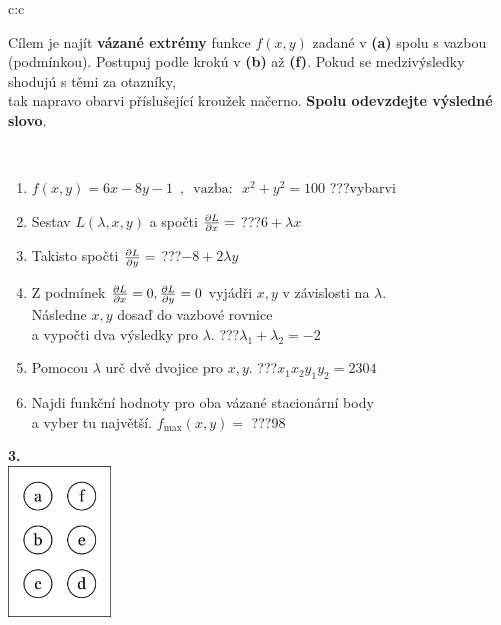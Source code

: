 \documentclass[10pt]{report}
\begin{document}
\begin{tabular}{c:c}
\begin{minipage}[c][104.5mm][t]{0.5\linewidth}
\begin{center}
\begin{minipage}{0.95\linewidth}
\begin{center}
Cílem je najít \textbf{vázané extrémy} funkce $f(x,y)$ zadané v \textbf{(a)} spolu s vazbou (podmínkou). Postupuj podle krokú v \textbf{(b)} až \textbf{(f)}. Pokud se medzivýsledky shodujú s těmi za otazníky,\\tak napravo obarvi příslušející kroužek načerno. \textbf{Spolu odevzdejte výsledné slovo}.
\end{center}
\end{minipage}
\\[1mm]
\begin{minipage}{0.79\linewidth}
\begin{center}
\begin{varwidth}{\linewidth}
\begin{enumerate}
\normalsize
\item $f(x,y)=6x-8y-1 \enspace , \enspace \mathrm{vazba:} \enspace x^2+y^2=100$\quad \dotfill\; ???\;\dotfill \quad vybarvi
\item Sestav $L(\lambda,x,y)$ a spočti $\pdv{L}{x}=$\quad \dotfill\; ???\;\dotfill \quad $6+\lambda x$
\item Takisto spočti $\pdv{L}{y}=$\quad \dotfill\; ???\;\dotfill \quad $-8+2\lambda y$
\item Z podmínek $\pdv{L}{x}=0 , \pdv{L}{y}=0$ vyjádři $x,y$ v závislosti na $\lambda$.\\ \phantom{xxxxxx}Následne $x,y$ dosaď do vazbové rovnice\\ \phantom{xxxxxx}a vypočti dva výsledky pro $\lambda$.\quad \dotfill\; ???\;\dotfill \quad $\lambda_1+\lambda_2=-2$
\item Pomocou $\lambda$ urč dvě dvojice pro $x,y$.\quad \dotfill\; ???\;\dotfill \quad $x_1 x_2 y_1 y_2=2304$
\item Najdi funkční hodnoty pro oba vázané stacionární body\\ \phantom{xxxxxx}a vyber tu najvětší. $f_{\text{max}}(x,y)=$\quad \dotfill\; ???\;\dotfill \quad $98$
\end{enumerate}
\end{varwidth}
\end{center}
\end{minipage}
\begin{minipage}{0.20\linewidth}
\begin{center}
{\Huge\bfseries 3.} \\[2mm]
\includegraphics[height=40mm]{../images/braille.png}

\end{center}
\end{minipage}
\end{center}
\end{minipage}
\end{tabular}
\end{document}
